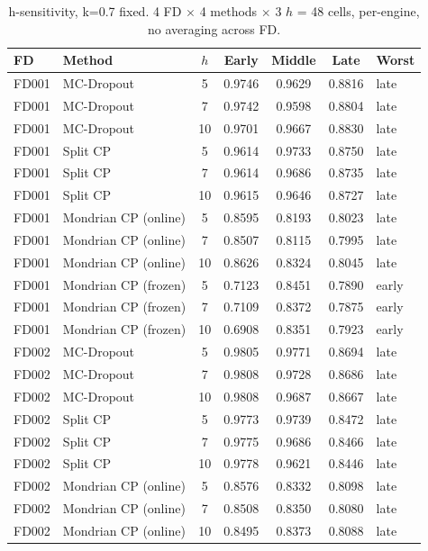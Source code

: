 \begin{table}[t]
\caption{h-sensitivity, k=0.7 fixed. 4 FD $\times$ 4 methods $\times$ 3 $h$ = 48 cells, per-engine, no averaging across FD.}
\label{tab:hsens-final}
\centering
\small
\begin{tabular}{llcccc}
\toprule
FD & Method & $h$ & Early & Middle & Late & Worst \\
\midrule
FD001 & MC-Dropout & 5 & 0.9746 & 0.9629 & 0.8816 & late \\
FD001 & MC-Dropout & 7 & 0.9742 & 0.9598 & 0.8804 & late \\
FD001 & MC-Dropout & 10 & 0.9701 & 0.9667 & 0.8830 & late \\
FD001 & Split CP & 5 & 0.9614 & 0.9733 & 0.8750 & late \\
FD001 & Split CP & 7 & 0.9614 & 0.9686 & 0.8735 & late \\
FD001 & Split CP & 10 & 0.9615 & 0.9646 & 0.8727 & late \\
FD001 & Mondrian CP (online) & 5 & 0.8595 & 0.8193 & 0.8023 & late \\
FD001 & Mondrian CP (online) & 7 & 0.8507 & 0.8115 & 0.7995 & late \\
FD001 & Mondrian CP (online) & 10 & 0.8626 & 0.8324 & 0.8045 & late \\
FD001 & Mondrian CP (frozen) & 5 & 0.7123 & 0.8451 & 0.7890 & early \\
FD001 & Mondrian CP (frozen) & 7 & 0.7109 & 0.8372 & 0.7875 & early \\
FD001 & Mondrian CP (frozen) & 10 & 0.6908 & 0.8351 & 0.7923 & early \\
FD002 & MC-Dropout & 5 & 0.9805 & 0.9771 & 0.8694 & late \\
FD002 & MC-Dropout & 7 & 0.9808 & 0.9728 & 0.8686 & late \\
FD002 & MC-Dropout & 10 & 0.9808 & 0.9687 & 0.8667 & late \\
FD002 & Split CP & 5 & 0.9773 & 0.9739 & 0.8472 & late \\
FD002 & Split CP & 7 & 0.9775 & 0.9686 & 0.8466 & late \\
FD002 & Split CP & 10 & 0.9778 & 0.9621 & 0.8446 & late \\
FD002 & Mondrian CP (online) & 5 & 0.8576 & 0.8332 & 0.8098 & late \\
FD002 & Mondrian CP (online) & 7 & 0.8508 & 0.8350 & 0.8080 & late \\
FD002 & Mondrian CP (online) & 10 & 0.8495 & 0.8373 & 0.8088 & late \\

\end{tabular}
\end{table}

